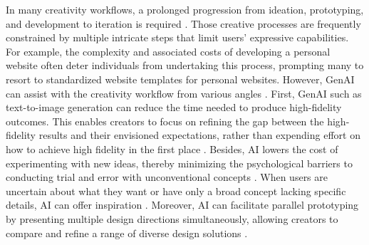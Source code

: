 In many creativity workflows, a prolonged progression from ideation, prototyping, and development to iteration is required \cite{palaniEvolvingRolesWorkflows2024}. Those creative processes are frequently constrained by multiple intricate steps that limit users' expressive capabilities. For example, the complexity and associated costs of developing a personal website often deter individuals from undertaking this process, prompting many to resort to standardized website templates for personal websites. However, GenAI can assist with the creativity workflow from various angles \cite{wanItFeltHaving2024,palaniEvolvingRolesWorkflows2024,longNotJustNovelty2024}. First, GenAI such as text-to-image generation can reduce the time needed to produce high-fidelity outcomes. This enables creators to focus on refining the gap between the high-fidelity results and their envisioned expectations, rather than expending effort on how to achieve high fidelity in the first place \cite{edwardsSketch2PrototypeRapidConceptual2024}. Besides, AI lowers the cost of experimenting with new ideas, thereby minimizing the psychological barriers to conducting trial and error with unconventional concepts \cite{palaniEvolvingRolesWorkflows2024}. When users are uncertain about what they want or have only a broad concept lacking specific details, AI can offer inspiration \cite{rickSupermindIdeatorExploring2023}. Moreover, AI can facilitate parallel prototyping by presenting multiple design directions simultaneously, allowing creators to compare and refine a range of diverse design solutions \cite{dowParallelPrototypingLeads2010}.